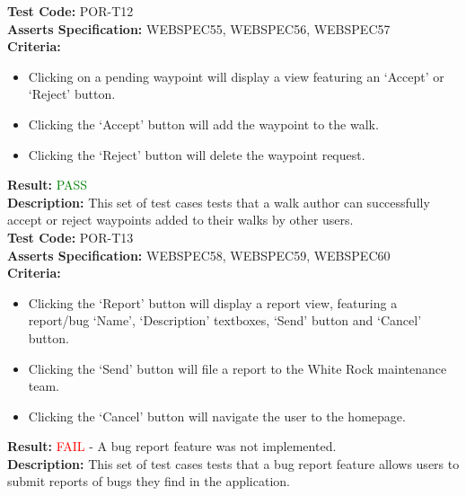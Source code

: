 \documentclass[11pt,a4paper]{report}
\begin{document}
\label{test:POR-T12}
\noindent\textbf{Test Code:} POR-T12\\
\textbf{Asserts Specification:} WEBSPEC55, WEBSPEC56, WEBSPEC57\\ 
\textbf{Criteria:} \begin{itemize}
                     \item Clicking on a pending waypoint will display a view featuring an `Accept' or `Reject' button.
                     \item Clicking the `Accept' button will add the waypoint to the walk.
                     \item Clicking the `Reject' button will delete the waypoint request.
                   \end{itemize}  
\textbf{Result:} \textcolor{green}{PASS}\\
\textbf{Description:} This set of test cases tests that a walk author can successfully accept or reject waypoints added to their walks by other users. \\

\label{test:POR-T13}
\noindent\textbf{Test Code:} POR-T13\\
\textbf{Asserts Specification:} WEBSPEC58, WEBSPEC59, WEBSPEC60\\ 
\textbf{Criteria:} \begin{itemize}
                     \item Clicking the `Report' button will display a report view, featuring a report/bug `Name', `Description' textboxes, `Send' button and `Cancel' button.
                     \item Clicking the `Send' button will file a report to the White Rock maintenance team.
                     \item Clicking the `Cancel' button will navigate the user to the homepage.
                   \end{itemize}  
\textbf{Result:} \textcolor{red}{FAIL} - A bug report feature was not implemented.\\
\textbf{Description:} This set of test cases tests that a bug report feature allows users to submit reports of bugs they find in the application. \\
\end{document}
